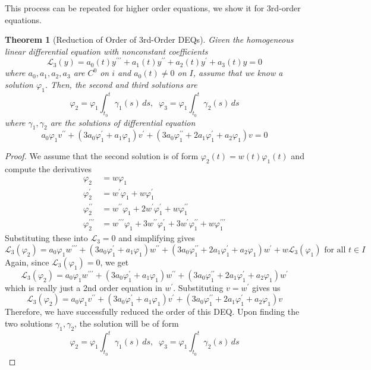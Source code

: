 \documentclass{article}
\newtheorem{theorem}{Theorem}[section]
\theoremstyle{remark}
\theoremstyle{definition}
\begin{document}
This process can be repeated for higher order equations, we show it for 3rd-order equations. 

\begin{theorem}[Reduction of Order of 3rd-Order DEQs]
Given the homogeneous linear differential equation with nonconstant coefficients
\[\mathcal{L}_3 (y) = a_0 (t) y^{\prime\prime\prime} + a_1 (t) y^{\prime\prime} + a_2 (t) y^\prime + a_3 (t) y = 0\]
where $a_0, a_1, a_2, a_3$ are $C^0$ on $i$ and $a_0 (t) \neq 0$ on $I$, assume that we know a solution $\varphi_1$. Then, the second and third solutions are
\[\varphi_2 = \varphi_1 \int_{t_0}^t \gamma_1(s)\,ds, \;\;\varphi_3 = \varphi_1 \int_{t_0}^t \gamma_2(s)\,ds\]
where $\gamma_1, \gamma_2$ are the solutions of differential equation
\[a_0 \varphi_1 v^{\prime\prime} + (3a_0 \varphi_1^\prime + a_1 \varphi_1) v^\prime + (3 a_0 \varphi_1^{\prime\prime} + 2a_1 \varphi_1^\prime + a_2 \varphi_1) v = 0\]
\end{theorem}
\begin{proof}
We assume that the second solution is of form $\varphi_2 (t) = w(t) \varphi_1(t)$ and compute the derivatives 
\begin{align*}
    \varphi_2 & = w \varphi_1 \\
    \varphi_2^\prime & = w^\prime \varphi_1 + w \varphi_1^\prime \\
    \varphi_2^{\prime\prime} & = w^{\prime\prime} \varphi_1 + 2 w^\prime \varphi_1^\prime + w \varphi_1^{\prime\prime} \\
    \varphi_2^{\prime\prime\prime} & = w^{\prime\prime\prime} \varphi_1 + 3 w^{\prime\prime} \varphi_1^\prime + 3 w^\prime \varphi_1^{\prime\prime} + w \varphi_1^{\prime\prime\prime}
\end{align*}
Substituting these into $\mathcal{L}_3 = 0$ and simplifying gives
\[\mathcal{L}_3 (\varphi_2) = a_0 \varphi_1 w^{\prime\prime\prime} + (3a_0 \varphi_1^\prime + a_1\varphi_1) w^{\prime\prime} + (3 a_0 \varphi_1^{\prime\prime} + 2a_1 \varphi_1^\prime + a_2 \varphi_1) w^\prime + w \mathcal{L}_3 (\varphi_1) \text{ for all } t\in I\]
Again, since $\mathcal{L}_3 (\varphi_1) = 0$, we get
\[\mathcal{L}_3 (\varphi_2) = a_0 \varphi_1 w^{\prime\prime\prime} + (3a_0 \varphi_1^\prime + a_1\varphi_1) w^{\prime\prime} + (3 a_0 \varphi_1^{\prime\prime} + 2a_1 \varphi_1^\prime + a_2 \varphi_1) w^\prime\]
which is really just a 2nd order equation in $w^\prime$. Substituting $v = w^\prime$ gives us
\[\mathcal{L}_3 (\varphi_2) = a_0 \varphi_1 v^{\prime\prime} + (3a_0 \varphi_1^\prime + a_1 \varphi_1) v^\prime + (3 a_0 \varphi_1^{\prime\prime} + 2a_1 \varphi_1^\prime + a_2 \varphi_1) v \]
Therefore, we have successfully reduced the order of this DEQ. Upon finding the two solutions $\gamma_1, \gamma_2$, the solution will be of form 
\[\varphi_2 = \varphi_1 \int_{t_0}^t \gamma_1(s)\,ds, \;\;\varphi_3 = \varphi_1 \int_{t_0}^t \gamma_2(s)\,ds\]
\end{proof}
\end{document}
